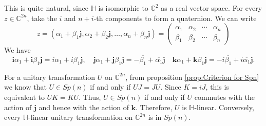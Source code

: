 \documentclass[../main.tex]{subfiles}
\begin{document}
\begin{remark}
	This is quite natural, since $\mathbb{H}$ is isomorphic to $\mathbb{C}^2$ as a real vector space. For every $z\in \mathbb{C}^{2n}$, take the $i$ and $n+i$-th components to form a quaternion. We can write
	\begin{equation*}
		z = (\alpha_1 + \beta_1 \boldsymbol{j}, \alpha_2 + \beta_2 \boldsymbol{j}, \ldots , \alpha_n + \beta_n \boldsymbol{j}) =
		\begin{pmatrix}
			\alpha_1 & \alpha_2 & \cdots & \alpha_n \\
			\beta_1  & \beta_2  & \cdots & \beta_n
		\end{pmatrix}
	\end{equation*}
	We have
	\begin{equation*}
		\boldsymbol{i} \alpha_1 + \boldsymbol{i} \beta_1 \boldsymbol{j} = i \alpha_1 + i \beta_1 \boldsymbol{j}, \quad
		\boldsymbol{j} \alpha_1 + \boldsymbol{j} \beta_1 \boldsymbol{j} = -\overline{\beta_1} + \overline{\alpha_1} \boldsymbol{j} \quad
		\boldsymbol{k} \alpha_1 + \boldsymbol{k} \beta_1 \boldsymbol{j} = -i \overline{\beta_1} + i \overline{\alpha_1} \boldsymbol{j}.
	\end{equation*}

	For a unitary transformation $U$ on $\mathbb{C}^{2n}$, from proposition \ref{prop:Criterion for Spn} we know that $U \in Sp(n)$ if and only if $U J = J U$. Since $K = i J$, this is equivalent to $U K = K U$. Thus, $U \in Sp(n)$ if and only if $U$ commutes with the action of $\boldsymbol{j}$ and hence with the action of $\boldsymbol{k}$. Therefore, $U$ is $\mathbb{H}$-linear. Conversely, every $\mathbb{H}$-linear unitary transformation on $\mathbb{C}^{2n}$ is in $Sp(n)$.


\end{remark}
\end{document}
